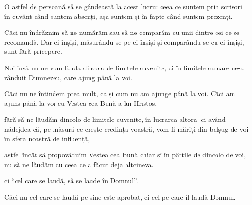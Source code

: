 {O astfel de persoană să se gândească la acest lucru: ceea ce suntem prin scrisori în cuvânt când suntem absenți, așa suntem și în fapte când suntem prezenți.


\par }{\PP {}Căci nu îndrăznim să ne numărăm sau să ne comparăm cu unii dintre cei ce se recomandă. Dar ei înșiși, măsurându-se pe ei înșiși și comparându-se cu ei înșiși, sunt fără pricepere.

Noi însă nu ne vom lăuda dincolo de limitele cuvenite, ci în limitele cu care ne-a rânduit Dumnezeu, care ajung până la voi.

Căci nu ne întindem prea mult, ca și cum nu am ajunge până la voi. Căci am ajuns până la voi cu Vestea cea Bună a lui Hristos,

fără să ne lăudăm dincolo de limitele cuvenite, în lucrarea altora, ci având nădejdea că, pe măsură ce crește credința voastră, vom fi măriți din belșug de voi în sfera noastră de influență,

astfel încât să propovăduim Vestea cea Bună chiar și în părțile de dincolo de voi, nu să ne lăudăm cu ceea ce a făcut deja altcineva.

ci “cel care se laudă, să se laude în Domnul”.

Căci nu cel care se laudă pe sine este aprobat, ci cel pe care îl laudă Domnul.



\par }
